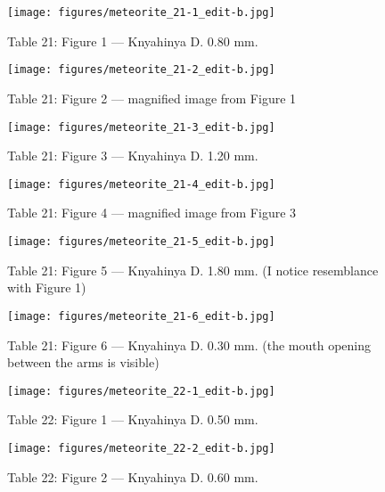 \documentclass[a4paper, 12pt, oneside]{article}
\begin{document}
\begin{figure}[t]
\texttt{[image: figures/meteorite\_21-1\_edit-b.jpg]}
\caption{Table 21: Figure 1 --- Knyahinya D. 0.80 mm.}
\centering
\end{figure}
\clearpage
\begin{figure}[t]
\texttt{[image: figures/meteorite\_21-2\_edit-b.jpg]}
\caption{Table 21: Figure 2 --- magnified image from Figure 1}
\centering
\end{figure}
\clearpage
\begin{figure}[t]
\texttt{[image: figures/meteorite\_21-3\_edit-b.jpg]}
\caption{Table 21: Figure 3 --- Knyahinya D. 1.20 mm.}
\centering
\end{figure}
\clearpage
\begin{figure}[t]
\texttt{[image: figures/meteorite\_21-4\_edit-b.jpg]}
\caption{Table 21: Figure 4 --- magnified image from Figure 3}
\centering
\end{figure}
\clearpage
\begin{figure}[t]
\texttt{[image: figures/meteorite\_21-5\_edit-b.jpg]}
\caption{Table 21: Figure 5 --- Knyahinya D. 1.80 mm. (I notice resemblance with Figure 1)}
\centering
\end{figure}
\clearpage
\begin{figure}[t]
\texttt{[image: figures/meteorite\_21-6\_edit-b.jpg]}
\caption{Table 21: Figure 6 --- Knyahinya D. 0.30 mm. (the mouth opening between the arms is visible)}
\centering
\end{figure}
\clearpage
{}
\begin{figure}[t]
\texttt{[image: figures/meteorite\_22-1\_edit-b.jpg]}
\caption{Table 22: Figure 1 --- Knyahinya D. 0.50 mm.}
\centering
\end{figure}
\clearpage
\begin{figure}[t]
\texttt{[image: figures/meteorite\_22-2\_edit-b.jpg]}
\caption{Table 22: Figure 2 --- Knyahinya D. 0.60 mm.}
\centering
\end{figure}
\end{document}
